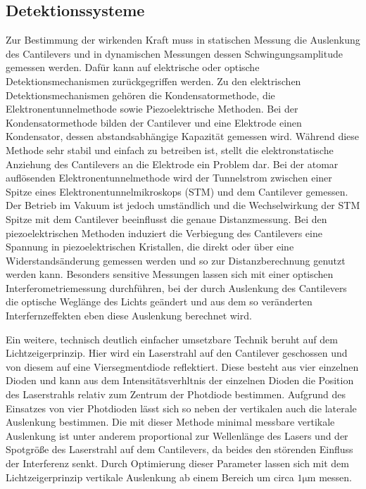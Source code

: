           \FloatBarrier




      \newpage
      \subsection{Detektionssysteme}
          Zur Bestimmung der wirkenden Kraft muss in statischen Messung die Auslenkung des Cantilevers und in dynamischen Messungen dessen Schwingungsamplitude gemessen werden. Dafür kann auf elektrische
          oder optische Detektionsmechanismen zurückgegriffen werden. 
          Zu den elektrischen Detektionsmechanismen gehören die Kondensatormethode, die Elektronentunnelmethode sowie Piezoelektrische Methoden. Bei der Kondensatormethode bilden der Cantilever und eine
          Elektrode einen Kondensator, dessen abstandsabhängige Kapazität gemessen wird. Während diese Methode sehr stabil und einfach zu betreiben ist, stellt die elektronstatische Anziehung des Cantilevers
          an die Elektrode ein Problem dar. Bei der atomar auflösenden Elektronentunnelmethode wird der Tunnelstrom zwischen einer Spitze eines Elektronentunnelmikroskops (STM) und dem Cantilever gemessen. 
          Der Betrieb im Vakuum ist jedoch umständlich und die Wechselwirkung der STM Spitze mit dem Cantilever beeinflusst die genaue Distanzmessung. Bei den piezoelektrischen Methoden induziert die Verbiegung
          des Cantilevers eine Spannung in piezoelektrischen Kristallen, die direkt oder über eine Widerstandsänderung gemessen werden und so zur Distanzberechnung genutzt werden kann. 
          Besonders sensitive Messungen lassen sich mit einer optischen Interferometriemessung durchführen, bei der durch Auslenkung des Cantilevers die optische Weglänge des Lichts geändert und aus dem so
          veränderten Interfernzeffekten eben diese Auslenkung berechnet wird.

          Ein weitere, technisch deutlich einfacher umsetzbare Technik beruht auf dem Lichtzeigerprinzip. Hier wird ein Laserstrahl auf den Cantilever geschossen und von diesem auf eine Viersegmentdiode 
          reflektiert. Diese besteht aus vier einzelnen Dioden und kann aus dem Intensitätsverhltnis der einzelnen Dioden die Position des Laserstrahls relativ zum Zentrum der Photdiode bestimmen. Aufgrund
          des Einsatzes von vier Photdioden lässt sich so neben der vertikalen auch die laterale Auslenkung bestimmen. Die mit dieser Methode minimal messbare vertikale Auslenkung ist unter anderem proportional
          zur Wellenlänge des Lasers und der Spotgröße des Laserstrahl auf dem Cantilevers, da beides den störenden Einfluss der Interferenz senkt. Durch Optimierung dieser Parameter lassen sich mit dem
          Lichtzeigerprinzip vertikale Auslenkung ab einem Bereich um circa $1 \si{\micro\metre}$ messen.


